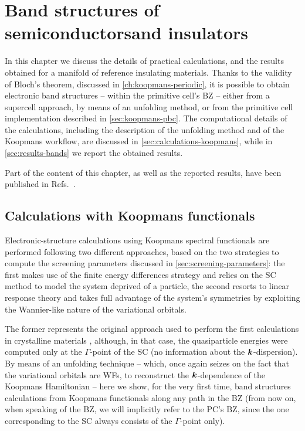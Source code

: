 \cleardoublepage
\chapter[Band structures of semiconductors and insulators]{Band structures of semiconductors\break and insulators\label{ch:band-structures}}
In this chapter we discuss the details of practical calculations, and the results obtained for a manifold of reference insulating materials. Thanks to the validity of Bloch's theorem, discussed in \cref{ch:koopmans-periodic}, it is possible to obtain electronic band structures -- within the primitive cell's BZ -- either from a supercell approach, by means of an unfolding method, or from the primitive cell implementation described in \cref{sec:koopmans-pbc}. The computational details of the calculations, including the description of the unfolding method and of the Koopmans workflow, are discussed in \cref{sec:calculations-koopmans}, while in \cref{sec:results-bands} we report the obtained results.

Part of the content of this chapter, as well as the reported results, have been published in Refs.~\cite{de_gennaro_blochs_2022,colonna_koopmans_2022}.

\clearpage
\section{Calculations with Koopmans functionals\label{sec:calculations-koopmans}}
Electronic-structure calculations using Koopmans spectral functionals are performed following two different approaches, based on the two strategies to compute the screening parameters discussed in \cref{sec:screening-parameters}: the first makes use of the finite energy differences strategy and relies on the SC method to model the system deprived of a particle, the second resorts to linear response theory and takes full advantage of the system's symmetries by exploiting the Wannier-like nature of the variational orbitals.

The former represents the original approach used to perform the first calculations in crystalline materials \cite{nguyen_koopmans-compliant_2018}, although, in that case, the quasiparticle energies were computed only at the $\Gamma$-point of the SC (no information about the ${\bm k}$-dispersion). By means of an unfolding technique -- which, once again seizes on the fact that the variational orbitals are WFs, to reconstruct the ${\bm k}$-dependence of the Koopmans Hamiltonian -- here we show, for the very first time, band structures calculations from Koopmans functionals along any path in the BZ \cite{de_gennaro_blochs_2022} (from now on, when speaking of the BZ, we will implicitly refer to the PC's BZ, since the one corresponding to the SC always consists of the $\Gamma$-point only).


